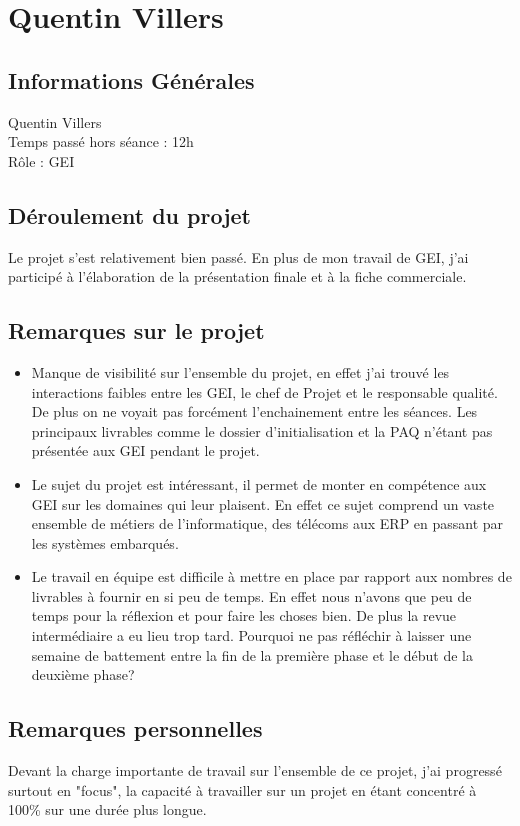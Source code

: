 \section{Quentin Villers}

\subsection{Informations Générales}

Quentin Villers \\
Temps passé hors séance : 12h \\
Rôle : GEI

\subsection{Déroulement du projet}

Le projet s'est relativement bien passé. En plus de mon travail de GEI, j'ai 
participé à l'élaboration de la présentation finale et à la fiche commerciale.

\subsection{Remarques sur le projet}
\begin{itemize}
\item Manque de visibilité sur l'ensemble du projet, en effet j'ai trouvé les
interactions faibles entre les GEI, le chef de Projet et le responsable qualité.
De plus on ne voyait pas forcément l'enchainement entre les séances.
Les principaux livrables comme le dossier d'initialisation et la PAQ n'étant pas
présentée aux GEI pendant le projet. 
\item Le sujet du projet est intéressant, il permet de monter en compétence aux GEI sur
les domaines qui leur plaisent. En effet ce sujet comprend un vaste ensemble de métiers
de l'informatique, des télécoms aux ERP en passant par les systèmes embarqués.
\item Le travail en équipe est difficile à mettre en place par rapport aux 
nombres de livrables à fournir en si peu de temps. En effet nous n'avons que peu 
de temps pour la réflexion et pour faire les choses bien. De plus la revue intermédiaire
a eu lieu trop tard. Pourquoi ne pas réfléchir à laisser une semaine de battement
entre la fin de la première phase et le début de la deuxième phase?
\end{itemize}

\subsection{Remarques personnelles}
\begin{itemize}
Devant la charge importante de travail sur l'ensemble de ce projet, j'ai progressé
surtout en "focus", la capacité à travailler sur un projet en étant concentré à 100\%
sur une durée plus longue.

\end{itemize}
